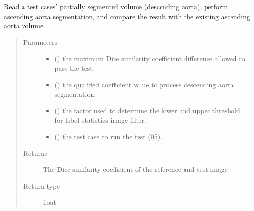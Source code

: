 \documentclass[letterpaper,10pt,english]{sphinxmanual}
\begin{document}

\begin{fulllineitems}
\label{\detokenize{test:test_image_preprocessing.test_compare_asc}}
\sphinxAtStartPar
Read a test cases’ partially segmented volume (descending aorta),
perform ascending aorta segmentation,
and compare the result with the existing ascending aorta volume
\begin{quote}\begin{description}
\item[{Parameters}] \leavevmode\begin{itemize}
\item {} 
\sphinxAtStartPar
{} () \textendash{} the maximum Dice similarity coefficient difference allowed to pass the test.

\item {} 
\sphinxAtStartPar
{} () \textendash{} the qualified coefficient value to process descending aorta segmentation.

\item {} 
\sphinxAtStartPar
{} () \textendash{} the factor used to determine the lower and upper threshold for label statistics image filter.

\item {} 
\sphinxAtStartPar
{} () \textendash{} the test case to run the test (0\sphinxhyphen{}5).

\end{itemize}

\item[{Returns}] \leavevmode
\sphinxAtStartPar
The Dice similarity coefficient of the reference and test image

\item[{Return type}] \leavevmode
\sphinxAtStartPar
float

\end{description}\end{quote}

\end{fulllineitems}
\end{document}
